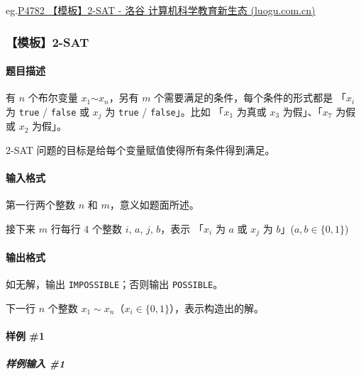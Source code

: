 \documentclass[]{article}
\let\oldparagraph\paragraph
\renewcommand{\paragraph}[1]{\oldparagraph{#1}\mbox{}}
\let\oldsubparagraph\subparagraph
\renewcommand{\subparagraph}[1]{\oldsubparagraph{#1}\mbox{}}
\begin{document}
eg.\href{https://www.luogu.com.cn/problem/P4782}{P4782 【模板】2-SAT -
洛谷 \textbar{} 计算机科学教育新生态 (luogu.com.cn)}

\hypertarget{ux6a21ux677f2-sat}{%
\subsubsection{【模板】2-SAT}\label{ux6a21ux677f2-sat}}

\hypertarget{ux9898ux76eeux63cfux8ff0}{%
\paragraph{题目描述}\label{ux9898ux76eeux63cfux8ff0}}

有 \(n\) 个布尔变量 \(x_1\)\(\sim\)\(x_n\)，另有 \(m\)
个需要满足的条件，每个条件的形式都是 「\(x_i\) 为 \texttt{true} /
\texttt{false} 或 \(x_j\) 为 \texttt{true} / \texttt{false}」。比如
「\(x_1\) 为真或 \(x_3\) 为假」、「\(x_7\) 为假或 \(x_2\) 为假」。

2-SAT 问题的目标是给每个变量赋值使得所有条件得到满足。

\hypertarget{ux8f93ux5165ux683cux5f0f-1}{%
\paragraph{输入格式}\label{ux8f93ux5165ux683cux5f0f-1}}

第一行两个整数 \(n\) 和 \(m\)，意义如题面所述。

接下来 \(m\) 行每行 \(4\) 个整数 \(i\), \(a\), \(j\), \(b\)，表示
「\(x_i\) 为 \(a\) 或 \(x_j\) 为 \(b\)」(\(a, b\in \{0,1\}\))

\hypertarget{ux8f93ux51faux683cux5f0f-1}{%
\paragraph{输出格式}\label{ux8f93ux51faux683cux5f0f-1}}

如无解，输出 \texttt{IMPOSSIBLE}；否则输出 \texttt{POSSIBLE}。

下一行 \(n\) 个整数
\(x_1\sim x_n\)（\(x_i\in\{0,1\}\)），表示构造出的解。

\hypertarget{ux6837ux4f8b-1-1}{%
\paragraph{样例 \#1}\label{ux6837ux4f8b-1-1}}

\hypertarget{ux6837ux4f8bux8f93ux5165-1-1}{%
\subparagraph{样例输入 \#1}\label{ux6837ux4f8bux8f93ux5165-1-1}}
\end{document}
